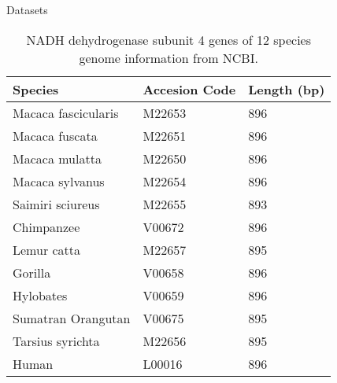 \documentclass[10pt]{beamer}
\newcommand{\1}{
	\setbeamertemplate{background}{
		\texttt{[image: img/1]}
		\tikz[overlay] \fill[fill opacity=0.75,fill=white] (0,0) rectangle (-\paperwidth,\paperheight);
	}
}
\begin{document}
\begin{frame}{Datasets}
\begin{table}[]
	\centering
	\caption{NADH dehydrogenase subunit 4 genes of 12 species genome information from NCBI.}
	\label{tab:nadhdb}
	\begin{tabular}{lll}
		\hline
		Species             & Accesion Code & Length (bp) \\ \hline
		Macaca fascicularis & M22653        & 896         \\
		Macaca fuscata      & M22651        & 896         \\
		Macaca mulatta      & M22650        & 896         \\
		Macaca sylvanus     & M22654        & 896         \\
		Saimiri sciureus    & M22655        & 893         \\
		Chimpanzee          & V00672        & 896         \\
		Lemur catta         & M22657        & 895         \\
		Gorilla             & V00658        & 896         \\
		Hylobates           & V00659        & 896         \\
		Sumatran Orangutan  & V00675        & 895         \\
		Tarsius syrichta    & M22656        & 895         \\
		Human               & L00016        & 896        \\ \hline
	\end{tabular}
\end{table}
\end{frame}
\end{document}
